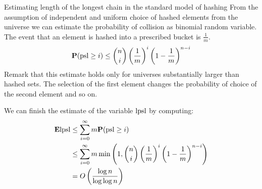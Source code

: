 \begin{section}{Estimating length of the longest chain in the standard model of hashing}
From the assumption of independent and uniform choice of hashed elements from the universe we can estimate the probability of collision as binomial random variable. The event that an element is hashed into a prescribed bucket is $\frac{1}{m}$.
\begin{displaymath}
\mathbf{P}(\mathrm{psl} \geq i) \leq \dbinom{n}{i}\left(\frac{1}{m}\right)^i\left(1 - \frac{1}{m}\right)^{n-i}
\end{displaymath}
Remark that this estimate holds only for universes substantially larger than hashed sets. The selection of the first element changes the probability of choice of the second element and so on.

We can finish the estimate of the variable $\mathrm{lpsl}$ by computing:
\begin{displaymath}
\begin{split}
\mathbf{E} \mathrm{lpsl}	& \leq \displaystyle \sum_{i = 0}^{\infty} m \mathbf{P}(\mathrm{psl} \geq i) \\
		& \leq \displaystyle \sum_{i = 0}^{\infty} m \min\left(1, \dbinom{n}{i}\left(\frac{1}{m}\right)^i\left(1 - \frac{1}{m}\right)^{n-i}\right) \\
		& = O\left(\frac{\log n}{\log \log n}\right)
\end{split}
\end{displaymath}
\end{section}

